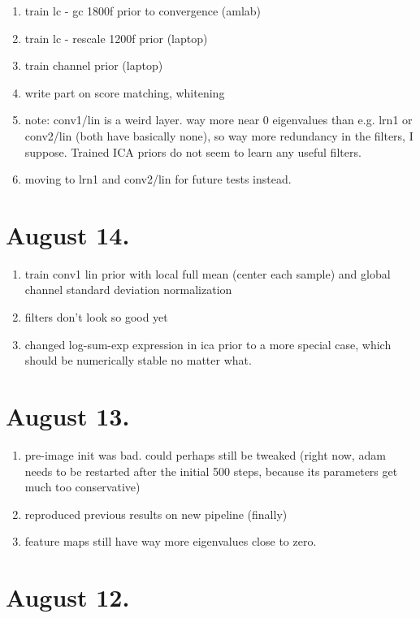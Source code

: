 \documentclass{article}
\begin{document}
\begin{enumerate}
	\item train lc - gc 1800f prior to convergence (amlab)
	\item train lc - rescale 1200f prior (laptop)
	\item train channel prior (laptop)
	\item write part on score matching, whitening
	\item note: conv1/lin is a weird layer. way more near 0 eigenvalues than e.g. lrn1 or conv2/lin (both have basically none), so way more redundancy in the filters, I suppose. Trained ICA priors do not seem to learn any useful filters.
	\item moving to lrn1 and conv2/lin for future tests instead.
\end{enumerate}



\section{August 14.}

\begin{enumerate}
	\item train conv1 lin prior with local full mean (center each sample) and global channel standard deviation normalization 
	\item filters don't look so good yet
	\item changed log-sum-exp expression in ica prior to a more special case, which should be numerically stable no matter what.
\end{enumerate}


\section{August 13.}

\begin{enumerate}
	\item pre-image init was bad. could perhaps still be tweaked (right now, adam needs to be restarted after the initial 500 steps, because its parameters get much too conservative)
	\item reproduced previous results on new pipeline (finally)
	\item feature maps still have way more eigenvalues close to zero.
\end{enumerate}


\section{August 12.}
\end{document}
